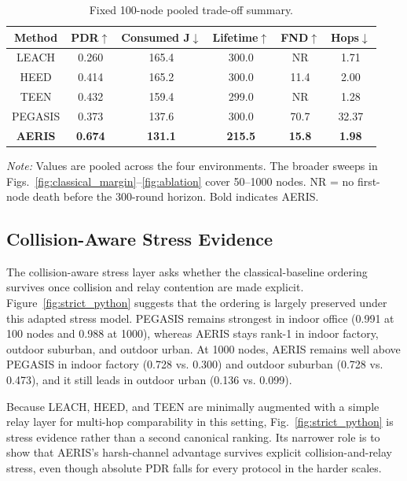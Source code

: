 \documentclass[conference]{IEEEtran}
\begin{document}
\begin{table}[!t]
\caption{Fixed 100-node pooled trade-off summary.}
\label{tbl:pooled_summary}
\centering
\scriptsize
\setlength{\tabcolsep}{2pt}
\begin{tabular*}{\columnwidth}{@{\extracolsep{\fill}}cccccc@{}}
\toprule
Method & PDR$\uparrow$ & Consumed J$\downarrow$ & Lifetime$\uparrow$ & FND$\uparrow$ & Hops$\downarrow$ \\
\midrule
LEACH & 0.260 & 165.4 & 300.0 & NR & 1.71 \\
HEED & 0.414 & 165.2 & 300.0 & 11.4 & 2.00 \\
TEEN & 0.432 & 159.4 & 299.0 & NR & 1.28 \\
PEGASIS & 0.373 & 137.6 & 300.0 & 70.7 & 32.37 \\
\midrule
\textbf{AERIS} & \textbf{0.674} & \textbf{131.1} & \textbf{215.5} & \textbf{15.8} & \textbf{1.98} \\
\bottomrule
\end{tabular*}
\vspace{3pt}
\parbox{\columnwidth}{\raggedright\scriptsize\emph{Note:} Values are pooled across the four environments. The broader sweeps in Figs.~\ref{fig:classical_margin}--\ref{fig:ablation} cover 50--1000 nodes. NR = no first-node death before the 300-round horizon. Bold indicates AERIS.}
\end{table}

\subsection{Collision-Aware Stress Evidence}
The collision-aware stress layer asks whether the classical-baseline ordering survives once collision and relay contention are made explicit. Figure~\ref{fig:strict_python} suggests that the ordering is largely preserved under this adapted stress model. PEGASIS remains strongest in indoor office (0.991 at 100 nodes and 0.988 at 1000), whereas AERIS stays rank-1 in indoor factory, outdoor suburban, and outdoor urban. At 1000 nodes, AERIS remains well above PEGASIS in indoor factory (0.728 vs. 0.300) and outdoor suburban (0.728 vs. 0.473), and it still leads in outdoor urban (0.136 vs. 0.099).

Because LEACH, HEED, and TEEN are minimally augmented with a simple relay layer for multi-hop comparability in this setting, Fig.~\ref{fig:strict_python} is stress evidence rather than a second canonical ranking. Its narrower role is to show that AERIS's harsh-channel advantage survives explicit collision-and-relay stress, even though absolute PDR falls for every protocol in the harder scales.
\end{document}
